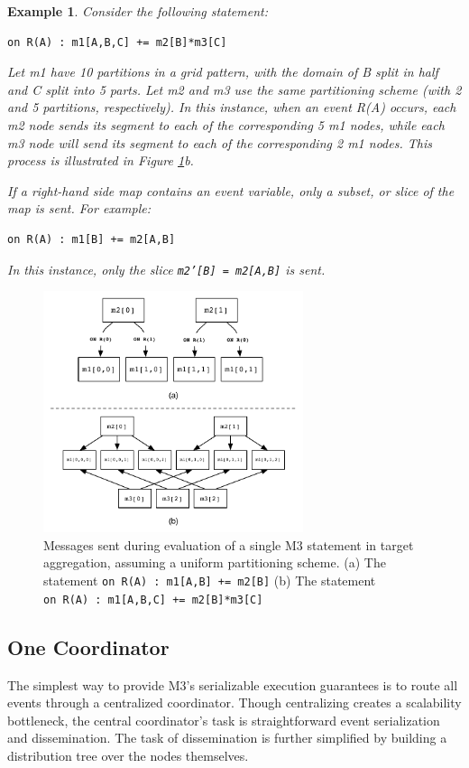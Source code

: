 \documentclass{vldb}
\newtheorem{example}[theorem]{Example}
\begin{document}
\begin{example}
Consider the following statement:
\begin{verbatim}
on R(A) : m1[A,B,C] += m2[B]*m3[C]
\end{verbatim}
Let m1 have 10 partitions in a grid pattern, with the domain of B split in half and C split into 5 parts.  Let m2 and m3 use the same partitioning scheme (with 2 and 5 partitions, respectively).  In this instance, when an event R(A) occurs, each m2 node sends its segment to each of the corresponding 5 m1 nodes, while each m3 node will send its segment to each of the corresponding 2 m1 nodes.  This process is illustrated in Figure \ref{fig:messagepassing}b. 

If a right-hand side map contains an event variable, only a subset, or slice of the map is sent.  For example:
\begin{verbatim}
on R(A) : m1[B] += m2[A,B]
\end{verbatim}
In this instance, only the slice \texttt{m2'[B] = m2[A,B]} is sent.
\end{example}

\begin{figure}
\begin{center}
\includegraphics[width=3in]{graphics/message_passing}
\caption{Messages sent during evaluation of a single M3 statement in target aggregation, assuming a uniform partitioning scheme.  (a) The statement \texttt{on~R(A)~:~m1[A,B]~+=~m2[B]} (b) The statement \texttt{on~R(A)~:~m1[A,B,C]~+=~m2[B]*m3[C]} }
\label{fig:messagepassing}
\end{center}
\end{figure}

\subsection{One Coordinator}
The simplest way to provide M3's serializable execution guarantees is to route all events through a centralized coordinator.  Though centralizing creates a scalability bottleneck, the central coordinator's task is straightforward event serialization and dissemination.  The task of dissemination is further simplified by building a distribution tree over the nodes themselves.
\end{document}
